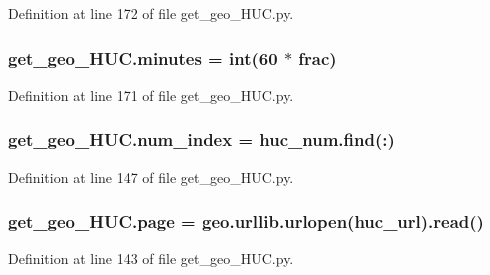 Definition at line 172 of file get\+\_\+geo\+\_\+\+H\+U\+C.\+py.

\subsubsection[{\texorpdfstring{minutes}{minutes}}]{\setlength{\rightskip}{0pt plus 5cm}get\+\_\+geo\+\_\+\+H\+U\+C.\+minutes = int(60 $\ast$ {\bf frac})}\hypertarget{namespaceget__geo___h_u_c_a8aeb9eaada16136431fe16303cf97135}{}\label{namespaceget__geo___h_u_c_a8aeb9eaada16136431fe16303cf97135}


Definition at line 171 of file get\+\_\+geo\+\_\+\+H\+U\+C.\+py.

\subsubsection[{\texorpdfstring{num\+\_\+index}{num_index}}]{\setlength{\rightskip}{0pt plus 5cm}get\+\_\+geo\+\_\+\+H\+U\+C.\+num\+\_\+index = huc\+\_\+num.\+find(\textquotesingle{}\+:\textquotesingle{})}\hypertarget{namespaceget__geo___h_u_c_a0e71504390ae6e1820bf73cf9cbc149f}{}\label{namespaceget__geo___h_u_c_a0e71504390ae6e1820bf73cf9cbc149f}


Definition at line 147 of file get\+\_\+geo\+\_\+\+H\+U\+C.\+py.

\subsubsection[{\texorpdfstring{page}{page}}]{\setlength{\rightskip}{0pt plus 5cm}get\+\_\+geo\+\_\+\+H\+U\+C.\+page = geo.\+urllib.\+urlopen({\bf huc\+\_\+url}).read()}\hypertarget{namespaceget__geo___h_u_c_a9a9f27e6a575181fcea56a1baed08456}{}\label{namespaceget__geo___h_u_c_a9a9f27e6a575181fcea56a1baed08456}


Definition at line 143 of file get\+\_\+geo\+\_\+\+H\+U\+C.\+py.

